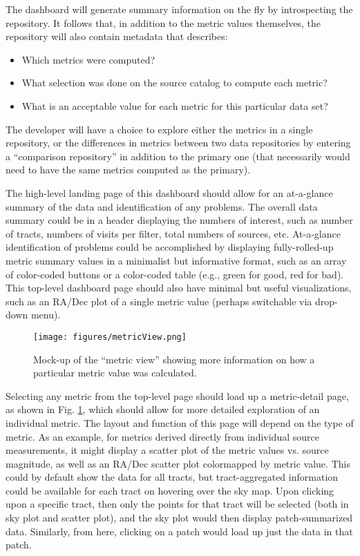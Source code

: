 The dashboard will generate summary information on the fly by introspecting the repository.
It follows that, in addition to the metric values themselves, the repository will also contain metadata that describes:
\begin{itemize}
    \item{Which metrics were computed?}
    \item{What selection was done on the source catalog to compute each metric?}
    \item{What is an acceptable value for each metric for this particular data set?}
\end{itemize}
The developer will have a choice to explore either the metrics in a single repository, or the differences in metrics between two data repositories by entering a ``comparison repository'' in addition to the primary one (that necessarily would need to have the same metrics computed as the primary).

The high-level landing page of this dashboard should allow for an at-a-glance summary of the data and identification of any problems.
The overall data summary could be in a header displaying the numbers of interest, such as number of tracts, numbers of visits per filter, total numbers of sources, etc.
At-a-glance identification of problems could be accomplished by displaying fully-rolled-up metric summary values in a minimalist but informative format, such as an array of color-coded buttons or a color-coded table (e.g., green for good, red for bad).
This top-level dashboard page should also have minimal but useful visualizations, such as an RA/Dec plot of a single metric value (perhaps switchable via drop-down menu).

\begin{figure}
  \begin{center}
    \texttt{[image: figures/metricView.png]}
  \end{center}
  \caption{
    Mock-up of the ``metric view'' showing more information on how a particular metric value was calculated.
  }
  \label{fig:comp:drill:metric}
\end{figure}

Selecting any metric from the top-level page should load up a metric-detail page, as shown in Fig. \ref{fig:comp:drill:metric}, which should allow for more detailed exploration of an individual metric.
The layout and function of this page will depend on the type of metric.
As an example, for metrics derived directly from individual source measurements, it might display a scatter plot of the metric values vs. source magnitude, as well as an RA/Dec scatter plot colormapped by metric value.
This could by default show the data for all tracts, but tract-aggregated information could be available for each tract on hovering over the sky map.
Upon clicking upon a specific tract, then only the points for that tract will be selected (both in sky plot and scatter plot), and the sky plot would then display patch-summarized data.
Similarly, from here, clicking on a patch would load up just the data in that patch.

